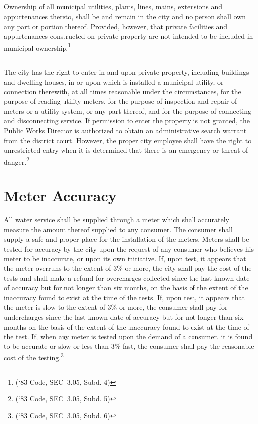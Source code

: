\subsection{}
Ownership of all municipal utilities, plants, lines, mains, extensions and appurtenances thereto, shall be and remain in the city and no person shall own any part or portion thereof.  Provided, however, that private facilities and appurtenances constructed on private property are not intended to be included in municipal ownership.\footnote{(‘83 Code, SEC. 3.05, Subd. 4)}
\subsection{}
The city has the right to enter in and upon private property, including buildings and dwelling houses, in or upon which is installed a municipal utility, or connection therewith, at all times reasonable under the circumstances, for the purpose of reading utility meters, for the purpose of inspection and repair of meters or a utility system, or any part thereof, and for the purpose of connecting and disconnecting service.  If permission to enter the property is not granted, the Public Works Director is authorized to obtain an administrative search warrant from the district court.  However, the proper city employee shall have the right to unrestricted entry when it is determined that there is an emergency or threat of danger.\footnote{(‘83 Code, SEC. 3.05, Subd. 5)}

\section{Meter Accuracy}
All water service shall be supplied through a meter which shall accurately measure the amount thereof supplied to any consumer. The consumer shall supply a safe and proper place for the installation of the meters. Meters shall be tested for accuracy by the city upon the request of any consumer who believes his meter to be inaccurate, or upon its own initiative.  If, upon test, it appears that the meter overruns to the extent of 3\% or more, the city shall pay the cost of the tests and shall make a refund for overcharges collected since the last known date of accuracy but for not longer than six months, on the basis of the extent of the inaccuracy found to exist at the time of the tests.  If, upon test, it appears that the meter is slow to the extent of 3\% or more, the consumer shall pay for undercharges since the last known date of accuracy but for not longer than six months on the basis of the extent of the inaccuracy found to exist at the time of the test.  If, when any meter is tested upon the demand of a consumer, it is found to be accurate or slow or less than 3\% fast, the consumer shall pay the reasonable cost of the testing.\footnote{(‘83 Code, SEC. 3.05, Subd. 6)}


